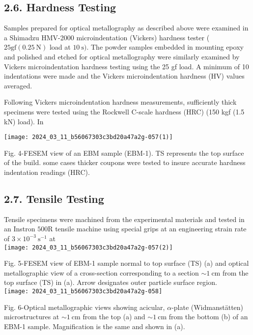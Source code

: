 \documentclass[10pt]{article}
\begin{document}
\subsection*{2.6. Hardness Testing}
Samples prepared for optical metallography as described above were examined in a Shimadzu HMV-2000 microindentation (Vickers) hardness tester ( $25 \mathrm{gf}(0.25 \mathrm{~N})$ load at $10 \mathrm{~s})$. The powder samples embedded in mounting epoxy and polished and etched for optical metallography were similarly examined by Vickers microindentation hardness testing using the 25 gf load. A minimum of 10 indentations were made and the Vickers microindentation hardness (HV) values averaged.

Following Vickers microindentation hardness measurements, sufficiently thick specimens were tested using the Rockwell C-scale hardness (HRC) (150 kgf (1.5 kN) load). In

\begin{center}
\texttt{[image: 2024\_03\_11\_b56067303c3bd20a47a2g-057(1)]}
\end{center}

Fig. 4-FESEM view of an EBM sample (EBM-1). TS represents the top surface of the build. some cases thicker coupons were tested to insure accurate hardness indentation readings (HRC).

\subsection*{2.7. Tensile Testing}
Tensile specimens were machined from the experimental materials and tested in an Instron $500 \mathrm{R}$ tensile machine using special grips at an engineering strain rate of $3 \times 10^{-3} \mathrm{~s}^{-1}$ at\\
\texttt{[image: 2024\_03\_11\_b56067303c3bd20a47a2g-057(2)]}

Fig. 5-FESEM view of EBM-1 sample normal to top surface (TS) (a) and optical metallographic view of a cross-section corresponding to a section $\sim 1 \mathrm{~cm}$ from the top surface (TS) in (a). Arrow designates outer particle surface region.\\
\texttt{[image: 2024\_03\_11\_b56067303c3bd20a47a2g-058]}

Fig. 6-Optical metallographic views showing acicular, $\alpha$-plate (Widmanstätten) microstructures at $\sim 1 \mathrm{~cm}$ from the top (a) and $\sim 1 \mathrm{~cm}$ from the bottom (b) of an EBM-1 sample. Magnification is the same and shown in (a).
\end{document}
